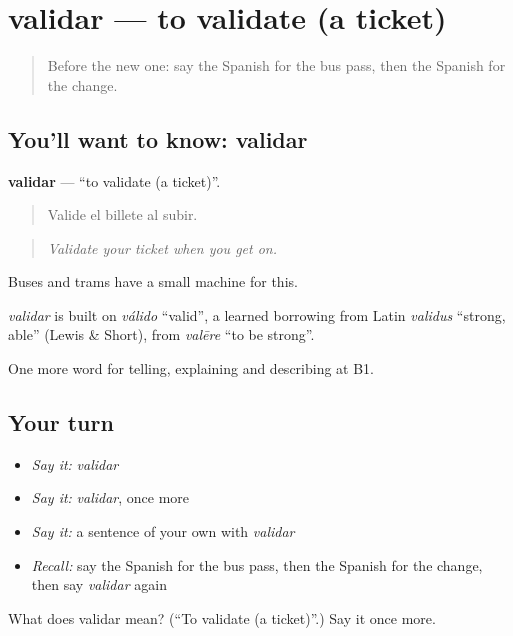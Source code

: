 \section[validar]{validar — to validate (a ticket)}

\label{lesson:ES-C650-validar}



\begin{quote}
Before the new one: say the Spanish for the bus pass, then the Spanish for the change.
\end{quote}

\subsection*{You'll want to know: validar}
\textbf{validar} — \textquotedblleft{}to validate (a ticket)\textquotedblright{}.

\begin{quote}
Valide el billete al subir.
\end{quote}

\begin{quote}
\emph{Validate your ticket when you get on.}
\end{quote}

Buses and trams have a small machine for this.

\begin{cousinweb}
\emph{validar} is built on \emph{válido} \textquotedblleft{}valid\textquotedblright{}, a learned borrowing from Latin \emph{validus} \textquotedblleft{}strong, able\textquotedblright{} (Lewis \& Short), from \emph{valēre} \textquotedblleft{}to be strong\textquotedblright{}.
\end{cousinweb}

\begin{grammarlens}[title={What you've built}]
One more word for telling, explaining and describing at B1.
\end{grammarlens}

\subsection*{Your turn}
\begin{itemize}
\raggedright
  \item \emph{Say it:} \emph{validar}
  \item \emph{Say it:} \emph{validar}, once more
  \item \emph{Say it:} a sentence of your own with \emph{validar}
  \item \emph{Recall:} say the Spanish for the bus pass, then the Spanish for the change, then say \emph{validar} again
\end{itemize}

\begin{tcolorbox}[breakable,colback=teal!4,colframe=teal!35!black,title={Before you move on}]
What does validar mean? (\textquotedblleft{}To validate (a ticket)\textquotedblright{}.) Say it once more.
\end{tcolorbox}
